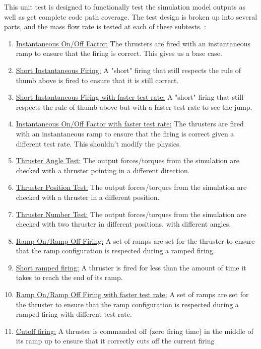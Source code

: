 \noindent This unit test is designed to functionally test the simulation model
outputs as well as get complete code path coverage.
The test design is broken
up into several parts, and the mass flow rate is tested at each of these subtests. :\\
\begin{enumerate}
\item{\underline{Instantaneous On/Off Factor:} The thrusters are fired with an
  instantaneous ramp to ensure that the firing is correct. This gives us a base case.}
\item{\underline{Short Instantaneous Firing:} A "short" firing that still respects the
  rule of thumb above is fired to ensure that it is still correct.}
 \item{\underline{Short Instantaneous Firing with faster test rate:} A "short" firing that still respects the
  rule of thumb above but with a faster test rate to see the jump.}
 \item{\underline{Instantaneous On/Off Factor with faster test rate:} The thrusters are fired with an
  instantaneous ramp to ensure that the firing is correct given a different test rate. This shouldn't modify the physics.}
 \item{\underline{Thruster Angle Test:} The output forces/torques from the simulation
  are checked with a thruster pointing in a different direction.}
   \item{\underline{Thruster Position Test:} The output forces/torques from the simulation
  are checked with a thruster in a different position.}
   \item{\underline{Thruster Number Test:} The output forces/torques from the simulation
  are checked with two thruster in different positions, with different angles.}
\item{\underline{Ramp On/Ramp Off Firing:} A set of ramps are set for the thruster to ensure
  that the ramp configuration is respected during a ramped firing.}
  \item{\underline{Short ramped firing:} A thruster is fired for less than the amount of time it
   takes to reach the end of its ramp.}
\item{\underline{Ramp On/Ramp Off Firing with faster test rate:} A set of ramps are set for the thruster to ensure
  that the ramp configuration is respected during a ramped firing with different test rate.}
\item{\underline{Cutoff firing:} A thruster is commanded off (zero firing time) in the middle
   of its ramp up to ensure that it correctly cuts off the current firing}

\end{enumerate}
